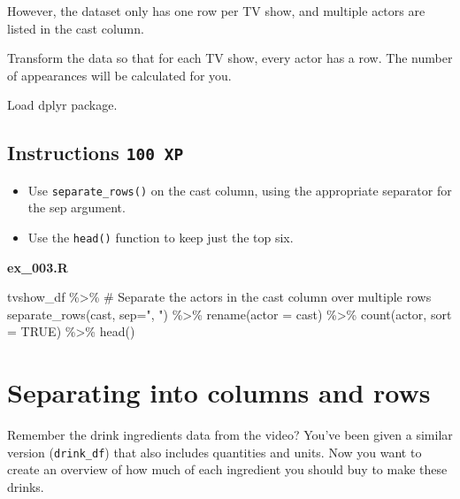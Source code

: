 \documentclass[
  letterpaper,
  DIV=11,
  numbers=noendperiod]{scrreprt}
\newenvironment{Shaded}{\begin{snugshade}}{\end{snugshade}}
\newcommand{\AttributeTok}[1]{\textcolor[rgb]{0.40,0.45,0.13}{#1}}
\newcommand{\CommentTok}[1]{\textcolor[rgb]{0.37,0.37,0.37}{#1}}
\newcommand{\ConstantTok}[1]{\textcolor[rgb]{0.56,0.35,0.01}{#1}}
\newcommand{\FunctionTok}[1]{\textcolor[rgb]{0.28,0.35,0.67}{#1}}
\newcommand{\NormalTok}[1]{\textcolor[rgb]{0.00,0.23,0.31}{#1}}
\newcommand{\SpecialCharTok}[1]{\textcolor[rgb]{0.37,0.37,0.37}{#1}}
\newcommand{\StringTok}[1]{\textcolor[rgb]{0.13,0.47,0.30}{#1}}
\providecommand{\tightlist}{%
  \setlength{\itemsep}{0pt}\setlength{\parskip}{0pt}}\usepackage{longtable,booktabs,array}
\begin{document}
However, the dataset only has one row per TV show, and multiple actors
are listed in the cast column.

Transform the data so that for each TV show, every actor has a row. The
number of appearances will be calculated for you.

Load dplyr package.

\hypertarget{instructions-100-xp-2}{%
\subsection*{\texorpdfstring{Instructions
\texttt{100\ XP}}{Instructions 100 XP}}\label{instructions-100-xp-2}}

\begin{itemize}
\tightlist
\item
  Use \texttt{separate\_rows()} on the cast column, using the
  appropriate separator for the sep argument.
\item
  Use the \texttt{head()} function to keep just the top six.
\end{itemize}

\textbf{ex\_003.R}

\begin{Shaded}
\begin{Highlighting}[]
\NormalTok{tvshow\_df }\SpecialCharTok{\%\textgreater{}\%} 
  \CommentTok{\# Separate the actors in the cast column over multiple rows}
  \FunctionTok{separate\_rows}\NormalTok{(cast, }\AttributeTok{sep=}\StringTok{", "}\NormalTok{) }\SpecialCharTok{\%\textgreater{}\%} 
  \FunctionTok{rename}\NormalTok{(}\AttributeTok{actor =}\NormalTok{ cast) }\SpecialCharTok{\%\textgreater{}\%} 
  \FunctionTok{count}\NormalTok{(actor, }\AttributeTok{sort =} \ConstantTok{TRUE}\NormalTok{) }\SpecialCharTok{\%\textgreater{}\%} 
  \FunctionTok{head}\NormalTok{()}
\end{Highlighting}
\end{Shaded}

\hypertarget{separating-into-columns-and-rows}{%
\section{Separating into columns and
rows}\label{separating-into-columns-and-rows}}

Remember the drink ingredients data from the video? You've been given a
similar version (\texttt{drink\_df}) that also includes quantities and
units. Now you want to create an overview of how much of each ingredient
you should buy to make these drinks.
\end{document}
